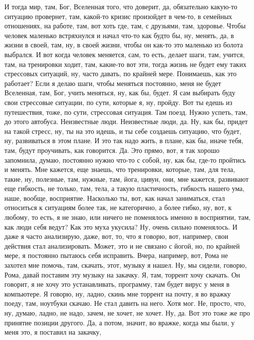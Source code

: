 И тогда мир, там, Бог, Вселенная
того, что доверит, да, обязательно
какую-то ситуацию провернет,
там, какой-то кризис произойдет в чем-то,
в семейных отношениях, на работе, там,
вот хоть где, там, с друзьями, там, здоровье.
Чтобы человек маленько
встряхнулся и начал
что-то как будто бы, ну, менять, да, в жизни
в своей, там, ну, в своей жизни,
чтобы он как-то это маленько
из болота выбрался.
И вот когда человек меняется,
сам, то есть, делает шаги, там, учится,
там, на тренировки ходит, там, какие-то
вот эти, тогда жизнь не будет ему таких
стрессовых ситуаций, ну, часто давать, по крайней
мере. Понимаешь, как это работает? Если я
делаю шаги, чтобы меняться постоянно,
меня не будет Вселенная, там, Бог, учить
меняться, ну, как бы, будет. Я сам
выбирать буду свои стрессовые ситуации,
по сути, которые я, ну, пройду.
Вот ты едешь из путешествия, тоже, по сути, стрессовая
ситуация. Там поезд.
Нужно успеть, там, до этого автобуса.
Неизвестные люди. Неизвестные люди, да.
Ну, как бы, придет на такой стресс, ну, ты на это идешь,
и ты себе создаешь ситуацию, что будет,
ну, развиваться в этом плане.
И это так надо жить, в плане, как бы,
иначе тебя, там, будут
проучивать, как говорится.
Да.
Это прямо, вот, я так хорошо запомнила, думаю, постоянно
нужно что-то с собой, ну, как бы, где-то
пройтись и менять.
Мне кажется, еще знаешь, что тренировки,
которые, там, для тела, такие,
ну, полезные, там, нужные,
там, йога, цивун,
они, мне кажется, развивают еще
гибкость, не только, там, тела,
а такую пластичность,
гибкость нашего ума,
наше, вообще, восприятие.
Насколько ты, вот,
как начал заниматься, стал относиться
к ситуациям более так,
не категорично, а более гибко,
ну, вот, к любому, то есть, я не знаю,
или ничего не поменялось именно
в восприятии, там, как люди себя ведут?
Как это муха укусила?
Ну,
очень сильно
поменялось. И даже я
часто анализирую,
даже, вот, то, что
я говорю, вот, например,
свои действия
стал анализировать.
Может, это и не связано с йогой, но,
по крайней мере, я постоянно пытаюсь
себя исправить. Вчера,
например, вот, Рома не захотел
мне помочь, там, скачать,
этот, музыку я нашел.
Ну, мы сидели, говорю, Рома, давай
поставим эту музыку на закачку.
Я, там, торрент хочу скачать. Он говорит,
я не хочу это устанавливать, программу,
там будет вирус у меня в компьютере.
Я говорю, ну, ладно,
скинь мне торрент на почту, я
во вражку поеду, там,
ноутбуки скачаю. Не стал
давить на него. Хотя мог.
Не, просто, что, ну, думаю,
ладно, не надо, зачем,
не хочет, не хочет. Ну, да.
Вот это тоже же про принятие позиции
другого. Да, а потом, значит, во вражке, когда мы
были, у меня это, я поставил на закачку,
